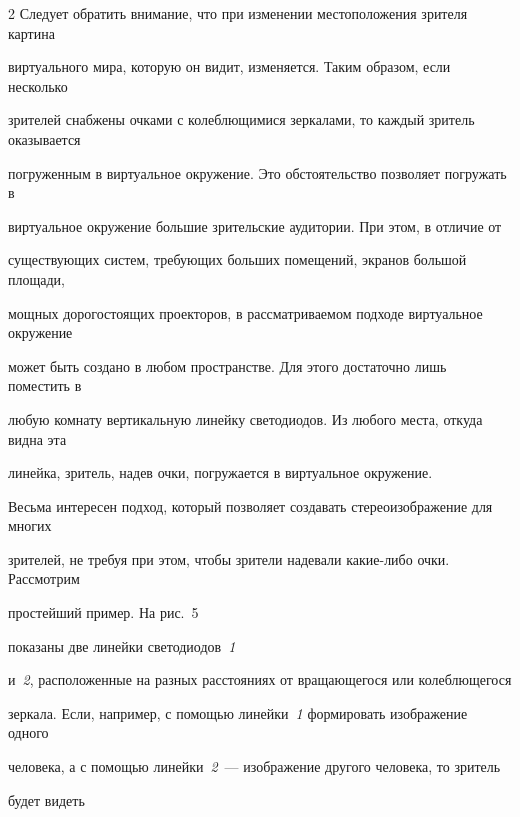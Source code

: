 \begin{multicols}{2}
  Следует обратить внимание, что при изменении местоположения зрителя картина 

виртуального мира, которую он видит, изменяется. Таким образом, если несколько 

зрителей снабжены очками с колеблющимися зеркалами, то каждый зритель оказывается 

погруженным в виртуальное окружение. Это обстоятельство позволяет погружать в 

виртуальное окружение большие зрительские аудитории. При этом, в отличие от 

существующих систем, требующих больших помещений, экранов большой площади, 

мощных дорогостоящих проекторов, в рассматриваемом подходе виртуальное окружение 

может быть создано в любом пространстве. Для этого достаточно лишь поместить в 

любую комнату вертикальную линейку светодиодов. Из любого мес\-та, откуда видна эта 

линейка, зритель, надев очки, погружается в виртуальное окружение. 

  



  

  

  Весьма интересен подход, который позволяет создавать стереоизображение для многих 

зрителей, не требуя при этом, чтобы зрители надевали какие-либо очки. Рассмотрим 

простейший пример. На рис.~5 %

показаны две линейки светодиодов~\textit{1} 

и~\textit{2}, расположенные на разных расстояниях от вращающегося или колеблющегося 

зеркала. Если, например, с помощью линейки~\textit{1} формировать изображение одного 

человека, а с помощью линейки~\textit{2}~--- изоб\-ра\-же\-ние другого человека, то зритель 

будет видеть\linebreak







\begin{center}


\end{center}
\end{multicols}
